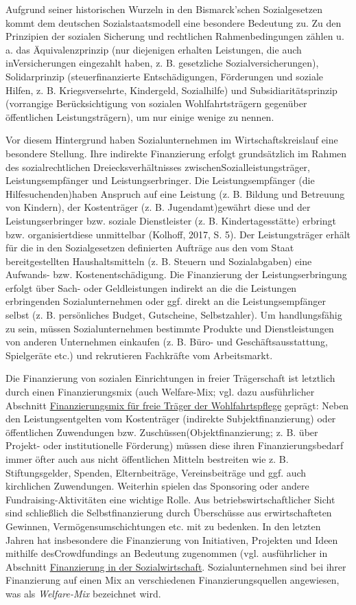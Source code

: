 \documentclass[
  letterpaper,
]{book}
\begin{document}
Aufgrund seiner historischen Wurzeln in den Bismarck'schen
Sozialgesetzen kommt dem deutschen Sozialstaatsmodell eine besondere
Bedeutung zu. Zu den Prinzipien der sozialen Sicherung und rechtlichen
Rahmenbedingungen zählen u. a. das Äquivalenzprinzip (nur diejenigen
erhalten Leistungen, die auch inVersicherungen eingezahlt haben, z. B.
gesetzliche Sozialversicherungen), Solidarprinzip (steuerfinanzierte
Entschädigungen, Förderungen und soziale Hilfen, z. B. Kriegsversehrte,
Kindergeld, Sozialhilfe) und Subsidiaritätsprinzip (vorrangige
Berücksichtigung von sozialen Wohlfahrtsträgern gegenüber öffentlichen
Leistungsträgern), um nur einige wenige zu nennen.

Vor diesem Hintergrund haben Sozialunternehmen im Wirtschaftskreislauf
eine besondere Stellung. Ihre indirekte Finanzierung erfolgt
grundsätzlich im Rahmen des sozialrechtlichen Dreiecksverhältnisses
zwischenSozialleistungsträger, Leistungsempfänger und
Leistungserbringer. Die Leistungsempfänger (die Hilfesuchenden)haben
Anspruch auf eine Leistung (z. B. Bildung und Betreuung von Kindern),
der Kostenträger (z. B. Jugendamt)gewährt diese und der
Leistungserbringer bzw. soziale Dienstleister (z. B. Kindertagesstätte)
erbringt bzw. organisiertdiese unmittelbar (Kolhoff, 2017, S. 5). Der
Leistungsträger erhält für die in den Sozialgesetzen definierten
Aufträge aus den vom Staat bereitgestellten Haushaltsmitteln (z. B.
Steuern und Sozialabgaben) eine Aufwands- bzw. Kostenentschädigung. Die
Finanzierung der Leistungserbringung erfolgt über Sach- oder
Geldleistungen indirekt an die die Leistungen erbringenden
Sozialunternehmen oder ggf. direkt an die Leistungsempfänger selbst (z.
B. persönliches Budget, Gutscheine, Selbstzahler). Um handlungsfähig zu
sein, müssen Sozialunternehmen bestimmte Produkte und Dienstleistungen
von anderen Unternehmen einkaufen (z. B. Büro- und Geschäftsausstattung,
Spielgeräte etc.) und rekrutieren Fachkräfte vom Arbeitsmarkt.

Die Finanzierung von sozialen Einrichtungen in freier Trägerschaft ist
letztlich durch einen Finanzierungsmix (auch Welfare-Mix; vgl. dazu
ausführlicher Abschnitt \hyperref[finanzierungsmix]{Finanzierungsmix für
freie Träger der Wohlfahrtspflege} geprägt: Neben den Leistungsentgelten
vom Kostenträger (indirekte Subjektfinanzierung) oder öffentlichen
Zuwendungen bzw. Zuschüssen(Objektfinanzierung; z. B. über Projekt- oder
institutionelle Förderung) müssen diese ihren Finanzierungsbedarf immer
öfter auch aus nicht öffentlichen Mitteln bestreiten wie z. B.
Stiftungsgelder, Spenden, Elternbeiträge, Vereinsbeiträge und ggf. auch
kirchlichen Zuwendungen. Weiterhin spielen das Sponsoring oder andere
Fundraising-Aktivitäten eine wichtige Rolle. Aus
betriebswirtschaftlicher Sicht sind schließlich die Selbstfinanzierung
durch Überschüsse aus erwirtschafteten Gewinnen, Vermögensumschichtungen
etc. mit zu bedenken. In den letzten Jahren hat insbesondere die
Finanzierung von Initiativen, Projekten und Ideen mithilfe
desCrowdfundings an Bedeutung zugenommen (vgl. ausführlicher in
Abschnitt \hyperref[finanzierung-sozialwirtschaft]{Finanzierung in der
Sozialwirtschaft}. Sozialunternehmen sind bei ihrer Finanzierung auf
einen Mix an verschiedenen Finanzierungsquellen angewiesen, was als
\emph{Welfare-Mix }bezeichnet wird.
\end{document}
